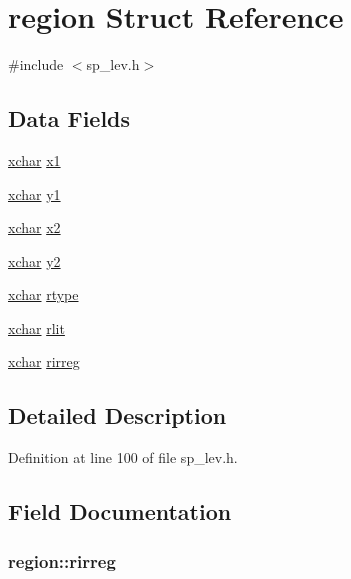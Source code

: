 \hypertarget{structregion}{\section{region Struct Reference}
\label{structregion}
}


{\ttfamily \#include $<$sp\+\_\+lev.\+h$>$}

\subsection*{Data Fields}
\begin{DoxyCompactItemize}
\item 
\hyperlink{global_8h_a2043b7d01ce89f4ee2fa6c345a752d32}{xchar} \hyperlink{structregion_a80b426260fecceafe00d352ecf1b6705}{x1}
\item 
\hyperlink{global_8h_a2043b7d01ce89f4ee2fa6c345a752d32}{xchar} \hyperlink{structregion_a09c21dfa357e760d19824a94a79990bc}{y1}
\item 
\hyperlink{global_8h_a2043b7d01ce89f4ee2fa6c345a752d32}{xchar} \hyperlink{structregion_af0027dbdcdf1abf65a30619bd48c2862}{x2}
\item 
\hyperlink{global_8h_a2043b7d01ce89f4ee2fa6c345a752d32}{xchar} \hyperlink{structregion_ab6a20ba1a0cdeeec5c17276ae9a48a6f}{y2}
\item 
\hyperlink{global_8h_a2043b7d01ce89f4ee2fa6c345a752d32}{xchar} \hyperlink{structregion_adf282130a82315ad09863c2297250ca0}{rtype}
\item 
\hyperlink{global_8h_a2043b7d01ce89f4ee2fa6c345a752d32}{xchar} \hyperlink{structregion_aa560a01138b08e4502606ee04264b61a}{rlit}
\item 
\hyperlink{global_8h_a2043b7d01ce89f4ee2fa6c345a752d32}{xchar} \hyperlink{structregion_a612d4e4affebfb9187cfdbd6e93e5716}{rirreg}
\end{DoxyCompactItemize}


\subsection{Detailed Description}


Definition at line 100 of file sp\+\_\+lev.\+h.



\subsection{Field Documentation}
\hypertarget{structregion_a612d4e4affebfb9187cfdbd6e93e5716}{
\subsubsection[{rirreg}]{ region\+::rirreg}}\label{structregion_a612d4e4affebfb9187cfdbd6e93e5716}


